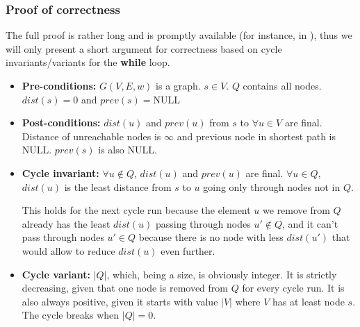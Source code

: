 \subsubsection{Proof of correctness}
The full proof is rather long and is promptly available (for instance, in \cite[p.~659]{intro-alg}), thus we will only present a short argument for correctness based on cycle invariants/variants for the \textbf{while} loop.
\begin{itemize}
    \item \textbf{Pre-conditions:} $G(V, E, w)$ is a graph. $s \in V$. $Q$ contains all nodes. $dist(s)=0$ and $prev(s)=\text{NULL}$
    \item \textbf{Post-conditions:} $dist(u)$ and $prev(u)$ from $s$ to $\forall u \in V$ are final. Distance of unreachable nodes is $\infty$ and previous node in shortest path is NULL. $prev(s)$ is also NULL.\par
    \item \textbf{Cycle invariant:} $\forall u \not \in Q$, $dist(u)$ and $prev(u)$ are final. $\forall u \in Q$, $dist(u)$ is the least distance from $s$ to $u$ going only through nodes not in $Q$.\par
    This holds for the next cycle run because the element $u$ we remove from $Q$ already has the least $dist(u)$ passing through nodes $u' \not \in Q$, and it can't pass through nodes $u' \in Q$ because there is no node with less $dist(u')$ that would allow to reduce $dist(u)$ even further.
    \item \textbf{Cycle variant:} $|Q|$, which, being a size, is obviously integer. It is strictly decreasing, given that one node is removed from $Q$ for every cycle run. It is also always positive, given it starts with value $|V|$ where $V$ has at least node $s$. The cycle breaks when $|Q| = 0$.
\end{itemize}
